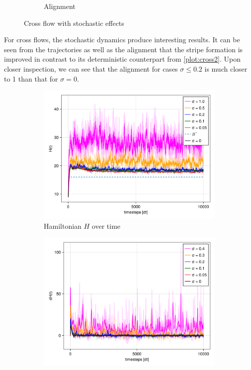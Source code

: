 \begin{itemize}
\begin{figure}[H]
\begin{subfigure}{.49\textwidth}
            \caption{Alignment}
            \label{plot:stoc_cross_alignment}
        \end{subfigure}
        \caption{Cross flow with stochastic effects}
        \label{plot:stoc_cross}
    \end{figure}
    For cross flows, the stochastic dynamics produce interesting results. It can be seen from the trajectories as well as the alignment that the stripe formation is improved in contrast to its deterministic counterpart from \autoref{plot:cross2}. Upon closer inspection, we can see that the alignment for cases $\sigma \leq 0.2$ is much closer to 1 than that for $\sigma = 0$.
    
    \begin{figure}[H]
        \centering
        \begin{subfigure}{.49\textwidth}
            \centering
            \includegraphics[width=\linewidth]{figures/ch5_collective_stoch/H_stochasic_cross.png}
            \caption{Hamiltonian $H$ over time}
            \label{plot:stoc_cross_h}
        \end{subfigure}
        \begin{subfigure}{.49\textwidth}
            \centering
            \includegraphics[width=\linewidth]{figures/ch5_collective_stoch/dH_stochasic_cross.png}

\end{subfigure}
\end{figure}
\end{itemize}
